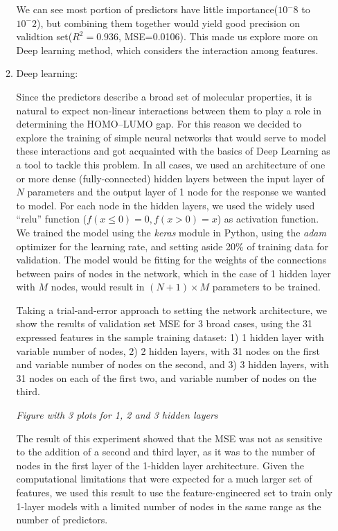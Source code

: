 \documentclass[11pt]{article}
\begin{document}
\begin{enumerate}
\begin{enumerate}
We can see most portion of predictors have little importance($10^-8$ to $10^-2$), but combining them together would yield good precision on validtion set($R^2 = 0.936$, MSE=0.0106). This made us explore more on Deep learning method, which considers the interaction among features.

\item Deep learning: 

Since the predictors describe a broad set of molecular properties, it is natural to expect non-linear interactions between them to play a role in determining the HOMO--LUMO gap. For this reason we decided to explore the training of simple neural networks that would serve to model these interactions and got acquainted with the basics of Deep Learning as a tool to tackle this problem. In all cases, we used an architecture of one or more dense (fully-connected) hidden layers between the input layer of $N$ parameters and the output layer of 1 node for the response we wanted to model. For each node in the hidden layers, we used the widely used ``relu'' function ($f(x \le 0) = 0, f(x > 0) = x$) as activation function. We trained the model using the \emph{keras} module in Python, using the \emph{adam} optimizer for the learning rate, and setting aside 20\% of training data for validation. The model would be fitting for the weights of the connections between pairs of nodes in the network, which in the case of 1 hidden layer with $M$ nodes, would result in $(N + 1) \times M$ parameters to be trained.

Taking a trial-and-error approach to setting the network architecture, we show the results of validation set MSE for 3 broad cases, using the 31 expressed features in the sample training dataset: 1) 1 hidden layer with variable number of nodes, 2) 2 hidden layers, with 31 nodes on the first and variable number of nodes on the second, and 3) 3 hidden layers, with 31 nodes on each of the first two, and variable number of nodes on the third.

\emph{Figure with 3 plots for 1, 2 and 3 hidden layers}

The result of this experiment showed that the MSE was not as sensitive to the addition of a second and third layer, as it was to the number of nodes in the first layer of the 1-hidden layer architecture. Given the computational limitations that were expected for a much larger set of features, we used this result to use the feature-engineered set to train only 1-layer models with a limited number of nodes in the same range as the number of predictors. \\



\end{enumerate}
\end{enumerate}
\end{document}

